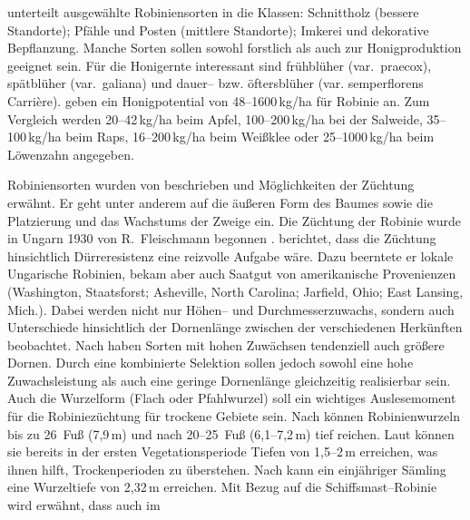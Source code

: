 \documentclass[twocolumn]{scrartcl}
\begin{document}
\citet{keresztesi1983robinie} unterteilt ausgewählte Robiniensorten in
die Klassen: Schnittholz (bessere Standorte); Pfähle und Posten
(mittlere Standorte); Imkerei und dekorative Bepflanzung. Manche
Sorten sollen sowohl forstlich als auch zur Honigproduktion geeignet
sein. Für die Honigernte interessant sind frühblüher (var.\ praecox),
spätblüher (var.\ galiana) und dauer-- bzw. öftersblüher
(var. semperflorens Carrière). \citet[S.~80]{crane1986honig} geben ein
Honigpotential von 48--1600\,kg/ha für Robinie an. Zum Vergleich werden
20--42\,kg/ha beim Apfel, 100--200\,kg/ha bei der Salweide,
35--100\,kg/ha beim Raps, 16--200\,kg/ha beim Weißklee oder
25--1000\,kg/ha beim Löwenzahn angegeben.

Robiniensorten wurden von \citet{vilmos1908robiniensorten} beschrieben
und Möglichkeiten der Züchtung erwähnt. Er geht unter anderem auf die
äußeren Form des Baumes sowie die Platzierung und das Wachstums der
Zweige ein.
Die Züchtung der Robinie wurde in Ungarn 1930 von R.~Fleischmann
begonnen \citep{keresztesi1983robinie}. \citet{fleischmann1933robinie}
berichtet, dass die Züchtung hinsichtlich Dürreresistenz eine
reizvolle Aufgabe wäre. Dazu beerntete er lokale Ungarische Robinien,
bekam aber auch Saatgut von amerikanische Provenienzen (Washington,
Staatsforst; Asheville, North Carolina; Jarfield, Ohio; East Lansing,
Mich.). %
Dabei werden nicht nur Höhen-- und Durchmesserzuwachs, sondern auch
Unterschiede hinsichtlich der Dornenlänge zwischen der verschiedenen
Herkünften beobachtet.
Nach \citet{bloes1992robinie,mebrahtu1989robinie} haben Sorten mit
hohen Zuwächsen
tendenziell auch größere Dornen. Durch eine kombinierte Selektion
sollen jedoch sowohl eine hohe Zuwachsleistung als auch eine geringe
Dornenlänge gleichzeitig realisierbar sein.
Auch die Wurzelform (Flach oder Pfahlwurzel) soll ein wichtiges Auslesemoment
für die Robiniezüchtung für trockene Gebiete sein.
Nach \citet{bunger1938robinieWurzeltiefe} können Robinienwurzeln
bis zu 26~Fuß (7{,}9\,m) und nach
\citet[S.~424]{harlow2000dendrology} 20--25~Fuß (6,1--7,2\,m) tief reichen.
Laut \citet{lyr1967wurzel}
können sie bereits in der ersten Vegetationsperiode Tiefen von
1{,}5--2\,m erreichen, was ihnen hilft, Trockenperioden zu überstehen.
Nach \citet[S.~38]{bluemke1955robinie} kann ein einjähriger Sämling eine
Wurzeltiefe von 2,32\,m erreichen.
Mit Bezug auf die
Schiffsmast--Robinie \citep{raber1936shipmast} wird erwähnt, dass auch im
\end{document}
